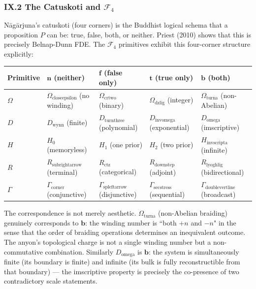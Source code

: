\documentclass[12pt,a4paper]{article}
\begin{document}
\subsubsection{IX.2 The Catuskoti and $\mathcal{F}_4$}
N\={a}g\={a}rjuna's catuskoti (four corners) is the Buddhist logical schema that a proposition $P$ can be: true, false, both, or neither. Priest (2010) shows that this is precisely Belnap-Dunn FDE. The $\mathcal{F}_4$ primitives exhibit this four-corner structure explicitly:

\begin{table}[htbp]
\centering
\small
{}
\begin{tabularx}{\textwidth}{>{\centering\arraybackslash}X >{\centering\arraybackslash}X >{\centering\arraybackslash}X >{\centering\arraybackslash}X >{\centering\arraybackslash}X}
\toprule
\rowcolor{gray!25}\textbf{Primitive} & \textbf{$\mathbf{n}$ (neither)} & \textbf{$\mathbf{f}$ (false only)} & \textbf{$\mathbf{t}$ (true only)} & \textbf{$\mathbf{b}$ (both)} \\
\midrule
\rowcolors{1}{white}{gray!10}
$\Omega$ & $\Omega_{\text{closeepsilon}}$ (no winding) & $\Omega_{\text{crtwo}}$ (binary) & $\Omega_{\text{dzlig}}$ (integer) & $\Omega_{\text{turna}}$ (non-Abelian) \\
$D$ & $D_{\text{wynn}}$ (finite) & $D_{\text{turnthree}}$ (polynomial) & $D_{\text{invomega}}$ (exponential) & $D_{\text{omega}}$ (imscriptive) \\
$H$ & $H_0$ (memoryless) & $H_1$ (one prior) & $H_2$ (two prior) & $H_{\text{invscripta}}$ (infinite) \\
$R$ & $R_{\text{subrightarrow}}$ (terminal) & $R_{\text{ctz}}$ (categorical) & $R_{\text{downstep}}$ (adjoint) & $R_{\text{lyoghlig}}$ (bidirectional) \\
$\Gamma$ & $\Gamma_{\text{corner}}$ (conjunctive) & $\Gamma_{\text{spleftarrow}}$ (disjunctive) & $\Gamma_{\text{secstress}}$ (sequential) & $\Gamma_{\text{doublevertline}}$ (broadcast) \\
\bottomrule
\end{tabularx}
\end{table}

The correspondence is not merely aesthetic. $\Omega_{\text{turna}}$ (non-Abelian braiding) genuinely corresponds to $\mathbf{b}$: the winding number is ``both $+n$ and $-n$" in the sense that the order of braiding operations determines an inequivalent outcome. The anyon's topological charge is not a single winding number but a non-commutative combination. Similarly $D_{\text{omega}}$ is $\mathbf{b}$: the system is simultaneously finite (its boundary is finite) and infinite (its bulk is fully reconstructible from that boundary) --- the imscriptive property is precisely the co-presence of two contradictory scale statements.
\end{document}
